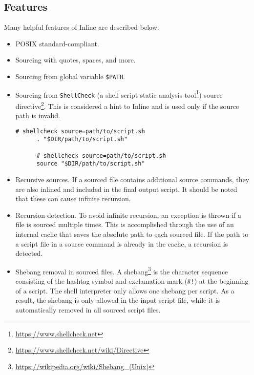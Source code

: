 \subsection{Features}
\label{subsec:corollary_projects_inline_features}

Many helpful features of Inline are described below.

\begin{itemize}
  \item POSIX standard-compliant.

  \item Sourcing with quotes, spaces, and more.

  \item Sourcing from global variable \texttt{\$PATH}.

  \item Sourcing from \texttt{ShellCheck} (a shell script static analysis tool\footnote{\url{https://www.shellcheck.net}})
    source directive\footnote{\url{https://www.shellcheck.net/wiki/Directive}}.
    \newline
    This is considered a hint to Inline and is used only if the source path is invalid.
    \newline
    \begin{lstlisting}[language=shell, alsoletter={.}, morekeywords={[2]{.}}, numbers=none, aboveskip=0pt, belowskip=0pt, abovecaptionskip=0pt, belowcaptionskip=0pt]
      # shellcheck source=path/to/script.sh
      . "$DIR/path/to/script.sh"

      # shellcheck source=path/to/script.sh
      source "$DIR/path/to/script.sh"
    \end{lstlisting}

  \item Recursive sources. If a sourced file contains additional source commands,
    they are also inlined and included in the final output script.
    \newline
    It should be noted that these can cause infinite recursion.

  \item Recursion detection. To avoid infinite recursion, an exception is thrown
    if a file is sourced multiple times. This is accomplished through the use of
    an internal cache that saves the absolute path to each sourced file. If the path
    to a script file in a source command is already in the cache, a recursion is
    detected.

  \item Shebang removal in sourced files.
    \newline
    A shebang\footnote{\url{https://wikipedia.org/wiki/Shebang_(Unix)}} is the
    character sequence consisting of the hashtag symbol and exclamation mark (\texttt{\#!})
    at the beginning of a script.
    \newline
    The shell interpreter only allows one shebang per script. As a result, the shebang
    is only allowed in the input script file, while it is automatically removed
    in all sourced script files.


\end{itemize}
